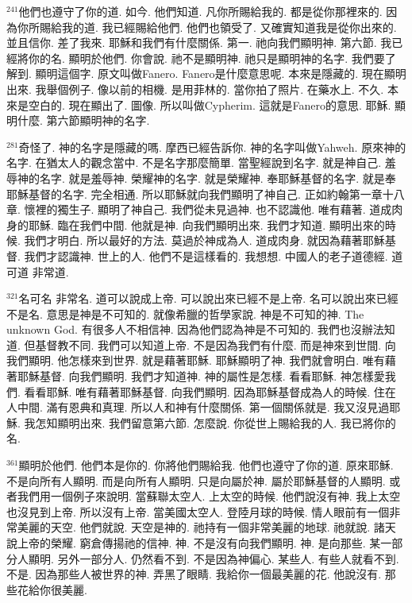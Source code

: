 \documentclass{book}
\begin{document}
$^{241}$他們也遵守了你的道.
如今.
他們知道.
凡你所賜給我的.
都是從你那裡來的.
因為你所賜給我的道.
我已經賜給他們.
他們也領受了.
又確實知道我是從你出來的.
並且信你.
差了我來.
耶穌和我們有什麼關係.
第一.
祂向我們顯明神.
第六節.
我已經將你的名.
顯明於他們.
你會說.
祂不是顯明神.
祂只是顯明神的名字.
我們要了解到.
顯明這個字.
原文叫做Fanero.
Fanero是什麼意思呢.
本來是隱藏的.
現在顯明出來.
我舉個例子.
像以前的相機.
是用菲林的.
當你拍了照片.
在藥水上.
不久.
本來是空白的.
現在顯出了.
圖像.
所以叫做Cypherim.
這就是Fanero的意思.
耶穌.
顯明什麼.
第六節顯明神的名字.

$^{281}$奇怪了.
神的名字是隱藏的嗎.
摩西已經告訴你.
神的名字叫做Yahweh.
原來神的名字.
在猶太人的觀念當中.
不是名字那麼簡單.
當聖經說到名字.
就是神自己.
羞辱神的名字.
就是羞辱神.
榮耀神的名字.
就是榮耀神.
奉耶穌基督的名字.
就是奉耶穌基督的名字.
完全相通.
所以耶穌就向我們顯明了神自己.
正如約翰第一章十八章.
懷裡的獨生子.
顯明了神自己.
我們從未見過神.
也不認識他.
唯有藉著.
道成肉身的耶穌.
臨在我們中間.
他就是神.
向我們顯明出來.
我們才知道.
顯明出來的時候.
我們才明白.
所以最好的方法.
莫過於神成為人.
道成肉身.
就因為藉著耶穌基督.
我們才認識神.
世上的人.
他們不是這樣看的.
我想想.
中國人的老子道德經.
道可道 非常道.

$^{321}$名可名 非常名.
道可以說成上帝.
可以說出來已經不是上帝.
名可以說出來已經不是名.
意思是神是不可知的.
就像希臘的哲學家說.
神是不可知的神.
The unknown God.
有很多人不相信神.
因為他們認為神是不可知的.
我們也沒辦法知道.
但基督教不同.
我們可以知道上帝.
不是因為我們有什麼.
而是神來到世間.
向我們顯明.
他怎樣來到世界.
就是藉著耶穌.
耶穌顯明了神.
我們就會明白.
唯有藉著耶穌基督.
向我們顯明.
我們才知道神.
神的屬性是怎樣.
看看耶穌.
神怎樣愛我們.
看看耶穌.
唯有藉著耶穌基督.
向我們顯明.
因為耶穌基督成為人的時候.
住在人中間.
滿有恩典和真理.
所以人和神有什麼關係.
第一個關係就是.
我又沒見過耶穌.
我怎知顯明出來.
我們留意第六節.
怎麼說.
你從世上賜給我的人.
我已將你的名.

$^{361}$顯明於他們.
他們本是你的.
你將他們賜給我.
他們也遵守了你的道.
原來耶穌.
不是向所有人顯明.
而是向所有人顯明.
只是向屬於神.
屬於耶穌基督的人顯明.
或者我們用一個例子來說明.
當蘇聯太空人.
上太空的時候.
他們說沒有神.
我上太空也沒見到上帝.
所以沒有上帝.
當美國太空人.
登陸月球的時候.
情人眼前有一個非常美麗的天空.
他們就說.
天空是神的.
祂持有一個非常美麗的地球.
祂就說.
諸天說上帝的榮耀.
窮倉傳揚祂的信神.
神.
不是沒有向我們顯明.
神.
是向那些.
某一部分人顯明.
另外一部分人.
仍然看不到.
不是因為神偏心.
某些人.
有些人就看不到.
不是.
因為那些人被世界的神.
弄黑了眼睛.
我給你一個最美麗的花.
他說沒有.
那些花給你很美麗.
\end{document}
